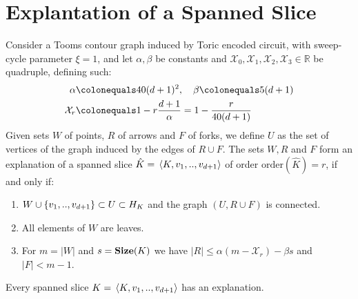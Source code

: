  \section{Explantation of a Spanned Slice}


  \begin{definition}
    Consider a Tooms contour graph induced by Toric encoded circuit, with sweep-cycle parameter $\xi = 1$, and  let $\alpha, \beta$ be constants and $\mathcal{X}_{0}, \mathcal{X}_{1}, \mathcal{X}_{2}, \mathcal{X}_{3} \in \mathbb{R}$ be quadruple, defining such:
    \begin{equation*}
      \begin{split}
      \alpha &\colonequals 40(d+1)^{2}, \ \ \  \beta \colonequals 5 (d+1) \\
      \mathcal{X}_{r} &\colonequals 1 - r \frac{d+1}{\alpha} = 1 -  \frac{r}{40(d+1)}
      \end{split}
    \end{equation*}
    Given sets $W$ of points, $R$ of arrows and $F$ of forks, we define $U$ as the set of vertices of the graph induced by the edges of $R \cup F$. The sets $W,R$ and $F$ form an explanation of a spanned slice $\hat{K} = \expval*{ K, v_{1}, .., v_{d+1}}$ of order $\text{order}(\hat{K}) = r$, if and only if: 
    \begin{enumerate}
      \item $W \cup \{v_{1} ,.., v_{d+1}\} \subset U \subset H_{K}$ and the graph $(U, R\cup F)$ is connected. 
      \item All elements of $W$ are leaves. 
      \item For $m = |W|$ and $s=\mathbf{Size}(K)$ we have $|R| \le \alpha (m - \mathcal{X}_{r}) - \beta s $ and $|F| < m -1 $. 
    \end{enumerate}
  \end{definition}

  \begin{claim}
    \label{claim:edgesin}
    Every spanned slice $K = \expval*{K,v_{1},..,v_{d+1}}$ has an explanation.
  \end{claim}

